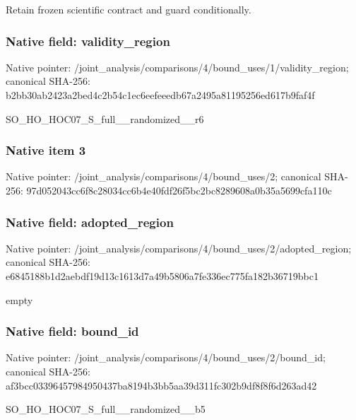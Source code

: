 \documentclass[10pt,a4paper]{article}
\begin{document}
\begingroup\raggedright\sloppy Retain frozen scientific contract and guard conditionally.\par\endgroup

\subsubsection{Native field: validity\_\allowbreak{}region}
Native pointer: /joint\_\allowbreak{}analysis/comparisons/4/bound\_\allowbreak{}uses/1/validity\_\allowbreak{}region; canonical SHA-256: b2bb30ab2423a2bed4c2b54c1ec6eefeeedb67a2495a81195256ed617b9faf4f

\begingroup\raggedright\sloppy SO\_\allowbreak{}HO\_\allowbreak{}HOC07\_\allowbreak{}S\_\allowbreak{}full\_\allowbreak{}\_\allowbreak{}randomized\_\allowbreak{}\_\allowbreak{}r6\par\endgroup

\subsubsection{Native item 3}
Native pointer: /joint\_\allowbreak{}analysis/comparisons/4/bound\_\allowbreak{}uses/2; canonical SHA-256: 97d052043cc6f8c28034cc6b4e40fdf26f5bc2bc8289608a0b35a5699cfa110c

\subsubsection{Native field: adopted\_\allowbreak{}region}
Native pointer: /joint\_\allowbreak{}analysis/comparisons/4/bound\_\allowbreak{}uses/2/adopted\_\allowbreak{}region; canonical SHA-256: e6845188b1d2aebdf19d13c1613d7a49b5806a7fe336ec775fa182b36719bbc1

\begingroup\raggedright\sloppy empty\par\endgroup

\subsubsection{Native field: bound\_\allowbreak{}id}
Native pointer: /joint\_\allowbreak{}analysis/comparisons/4/bound\_\allowbreak{}uses/2/bound\_\allowbreak{}id; canonical SHA-256: af3bcc03396457984950437ba8194b3bb5aa39d311fc302b9df8f8f6d263ad42

\begingroup\raggedright\sloppy SO\_\allowbreak{}HO\_\allowbreak{}HOC07\_\allowbreak{}S\_\allowbreak{}full\_\allowbreak{}\_\allowbreak{}randomized\_\allowbreak{}\_\allowbreak{}b5\par\endgroup
\end{document}
